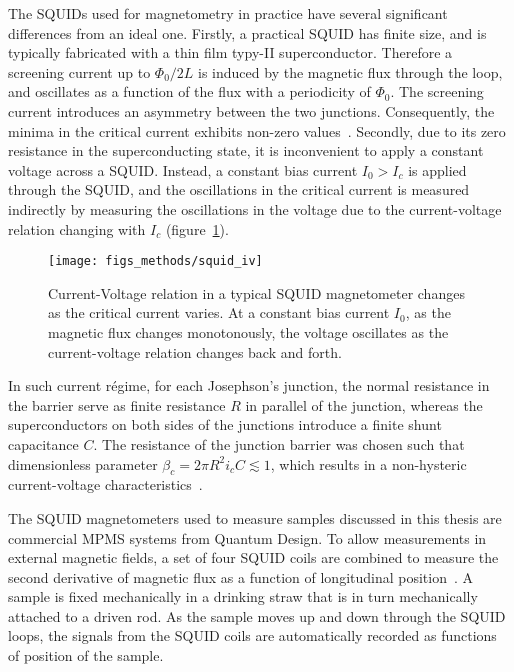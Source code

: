 The SQUIDs used for magnetometry in practice have several significant differences from an ideal one. Firstly, a practical SQUID has finite size, and is typically fabricated with a thin film typy-II superconductor. Therefore a screening current up to $\Phi_0 / 2L$ is induced by the magnetic flux through the loop, and oscillates as a function of the flux with a periodicity of $\Phi_0$. The screening current introduces an asymmetry between the two junctions. Consequently, the minima in the critical current exhibits non-zero values~\cite{Clarke1976}. Secondly, due to its zero resistance in the superconducting state, it is inconvenient to apply a constant voltage across a SQUID. Instead, a constant bias current $I_0 > I_c$ is applied through the SQUID, and the oscillations in the critical current is measured indirectly by measuring the oscillations in the voltage due to the current-voltage relation changing with $I_c$ (figure~\ref{fig:squid_iv}). %
\begin{figure}[ht]%
	\centering%
    \texttt{[image: figs\_methods/squid\_iv]}%
    \caption[Current-Voltage relation in a SQUID magnetometer]{\label{fig:squid_iv}Current-Voltage relation in a typical SQUID magnetometer changes as the critical current varies. At a constant bias current $I_0$, as the magnetic flux changes monotonously, the voltage oscillates as the current-voltage relation changes back and forth.}%
\end{figure}%
In such current r\'egime, for each Josephson's junction, the normal resistance in the barrier serve as finite resistance $R$ in parallel of the junction, whereas the superconductors on both sides of the junctions introduce a finite shunt capacitance $C$. The resistance of the junction barrier was chosen such that dimensionless parameter $\beta_c = 2\pi{}R^2i_cC \lesssim 1$, which results in a non-hysteric current-voltage characteristics~\cite{Hansma1971}.

The SQUID magnetometers used to measure samples discussed in this thesis are commercial MPMS systems from Quantum Design. To allow measurements in external magnetic fields, a set of four SQUID coils are combined to measure the second derivative of magnetic flux as a function of longitudinal position~\cite{mpms_hardware}. A sample is fixed mechanically in a drinking straw that is in turn mechanically attached to a driven rod. As the sample moves up and down through the SQUID loops, the signals from the SQUID coils are automatically recorded as functions of position of the sample.

